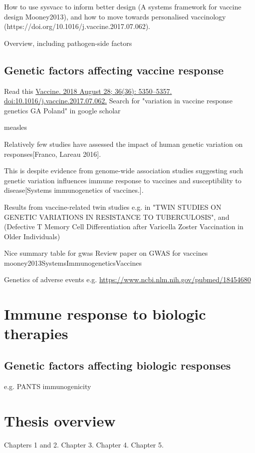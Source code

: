 How to use sysvacc to inform better design (A systems framework for vaccine design Mooney2013), and how to move towards personalised vaccinology (https://doi.org/10.1016/j.vaccine.2017.07.062).

Overview, including pathogen-side factors

\subsection{Genetic factors affecting vaccine response}

Read this \url{Vaccine. 2018 August 28; 36(36): 5350–5357. doi:10.1016/j.vaccine.2017.07.062.}
Search for "variation in vaccine response genetics GA Poland" in google scholar



measles

Relatively few studies have assessed the impact of human genetic variation on responses[Franco, Lareau 2016].

This is despite evidence from genome-wide association studies suggesting such genetic variation influences immune response to vaccines and susceptibility to disease[Systems immunogenetics of vaccines.].

Results from vaccine-related twin studies e.g. in "TWIN STUDIES ON GENETIC VARIATIONS IN RESISTANCE TO TUBERCULOSIS", and (Defective T Memory Cell Differentiation after Varicella Zoster Vaccination in Older Individuals)

Nice summary table for gwas 
Review paper on GWAS for vaccines mooney2013SystemsImmunogeneticsVaccines

Genetics of adverse events e.g. \url{https://www.ncbi.nlm.nih.gov/pubmed/18454680}

\section{Immune response to biologic therapies}

\subsection{Genetic factors affecting biologic responses}

e.g. PANTS immunogenicity

\section{Thesis overview}

Chapters 1 and 2.
Chapter 3.
Chapter 4.
Chapter 5.
